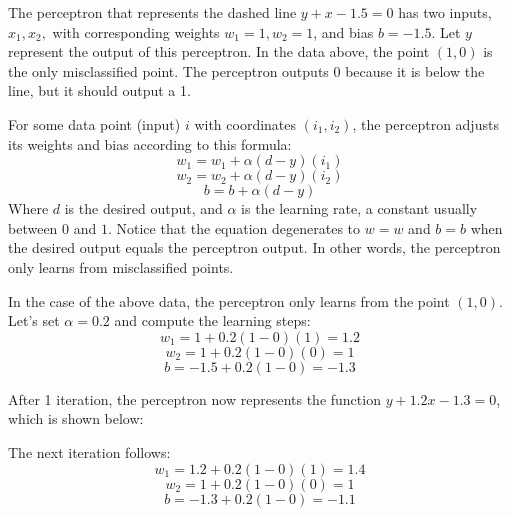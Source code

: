 The perceptron that represents the dashed line $y+x-1.5=0$ has two inputs, $x_1, x_2,$ with corresponding weights $w_1=1, w_2=1$, and bias $b = -1.5$. Let $y$ represent the output of this perceptron. In the data above, the point $(1, 0)$ is the only misclassified point. The perceptron outputs 0 because it is below the line, but it should output a 1.

For some data point (input) $i$ with coordinates $(i_1, i_2)$, the perceptron adjusts its weights and bias according to this formula:
\[w_1 = w_1 + \alpha(d-y)(i_1)\]
\[w_2 = w_2 + \alpha(d-y)(i_2)\]
\[b = b + \alpha(d-y)\]
Where $d$ is the desired output, and $\alpha$ is the learning rate, a constant usually between $0$ and $1$. Notice that the equation degenerates to $w = w$ and $b=b$ when the desired output equals the perceptron output. In other words, the perceptron only learns from misclassified points.

In the case of the above data, the perceptron only learns from the point $(1, 0)$. Let's set $\alpha=0.2$ and compute the learning steps:
\[w_1 = 1 + 0.2(1-0)(1) = 1.2\]
\[w_2 = 1 + 0.2(1-0)(0) = 1\]
\[b = -1.5 + 0.2(1-0) = -1.3\]

After 1 iteration, the perceptron now represents the function $y+1.2x-1.3 = 0$, which is shown below:
\begin{center}
\end{center}

The next iteration follows:
\[w_1 = 1.2 + 0.2(1-0)(1) = 1.4\]
\[w_2 = 1 + 0.2(1-0)(0) = 1\]
\[b = -1.3 + 0.2(1-0) = -1.1\]

\begin{center}
\end{center}

